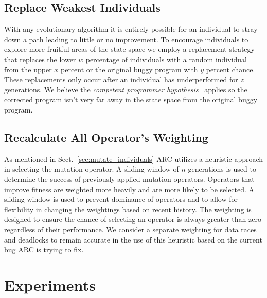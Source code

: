 \documentclass{llncs}
\begin{document}
\subsection{Replace Weakest Individuals}
\label{sec:replace_weakest_individuals}

With any evolutionary algorithm it is entirely possible for an individual to
stray down a path leading to little or no improvement. To encourage individuals
to explore more fruitful areas of the state space we employ a replacement
strategy that replaces the lower $w$ percentage of individuals with a random
individual from the upper $x$ percent or the original buggy program with $y$ percent chance.
These replacements only occur after an
individual has underperformed for $z$ generations. We believe the
\textit{competent programmer hypothesis}~\cite{?} applies so the corrected
program isn't very far away in the state space from the original buggy program.

\subsection{Recalculate All Operator's Weighting}
\label{sec:recalculate_operator_weighting}

As mentioned in Sect.~\ref{sec:mutate_individuals} ARC utilizes a heuristic approach in selecting the mutation operator. A sliding window of $n$ generations is used to determine the
success of previously applied mutation operators. Operators that improve fitness
are weighted more heavily and are more likely to be selected. A sliding window
is used to prevent dominance of operators and to allow for flexibility in
changing the weightings based on recent history. The weighting is designed to ensure
the chance of selecting an operator is always greater than zero regardless of their performance.
We consider a separate weighting for data races and deadlocks to remain accurate in the use of this heuristic based on the current bug ARC is trying to fix.

\section{Experiments}
\label{sec:experiments}
\end{document}
